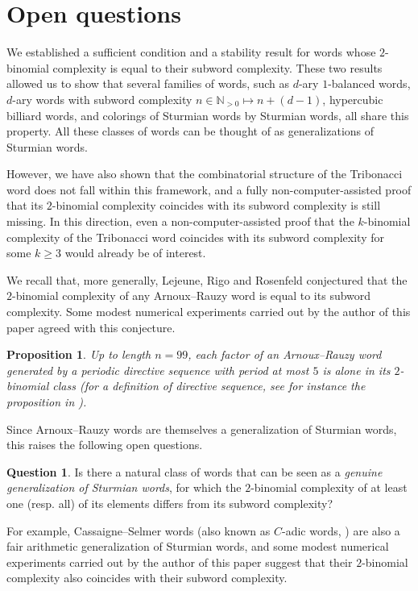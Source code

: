 \documentclass{template_arxiv}
\newtheorem{proposition}[lemma]{Proposition}
\theoremstyle{definition}
\newtheorem{question}{Question}
\newcommand{\N}{\mathbb{N}}
\begin{document}
\section{Open questions}\label{sec:conclusion}

We established a sufficient condition and a stability result for words whose $2$-binomial complexity is equal to their subword complexity. These two results allowed us to show that several families of words, such as $d$-ary $1$-balanced words, $d$-ary words with subword complexity $n\in\N_{>0}\mapsto n+(d-1)$, hypercubic billiard words, and colorings of Sturmian words by Sturmian words, all share this property. All these classes of words can be thought of as generalizations of Sturmian words.

However, we have also shown that the combinatorial structure of the Tribonacci word does not fall within this framework, and a fully non-computer-assisted proof that its $2$-binomial complexity coincides with its subword complexity is still missing. In this direction, even a non-computer-assisted proof that the $k$-binomial complexity of the Tribonacci word coincides with its subword complexity for some $k\geq 3$ would already be of interest.


We recall that, more generally, Lejeune, Rigo and Rosenfeld conjectured that the $2$-binomial complexity of any Arnoux--Rauzy word is equal to its subword complexity. Some modest numerical experiments carried out by the author of this paper agreed with this conjecture.

\begin{proposition}
Up to length $n=99$, each factor of an Arnoux--Rauzy word generated by a periodic directive sequence with period at most $5$ is alone in its $2$-binomial class (for a definition of directive sequence, see for instance the proposition in \cite[Section~2]{AR91}).
\end{proposition}

Since Arnoux--Rauzy words are themselves a generalization of Sturmian words, this raises the following open questions.

\begin{question}
Is there a natural class of words that can be seen as a \emph{genuine generalization of Sturmian words}, for which the $2$-binomial complexity of at least one (resp. all) of its elements differs from its subword complexity?
\end{question}

For example, Cassaigne--Selmer words (also known as $C$-adic words, \cite{CLL17,CLL22}) are also a fair arithmetic generalization of Sturmian words, and some modest numerical experiments carried out by the author of this paper suggest that their $2$-binomial complexity also coincides with their subword complexity.
\end{document}

